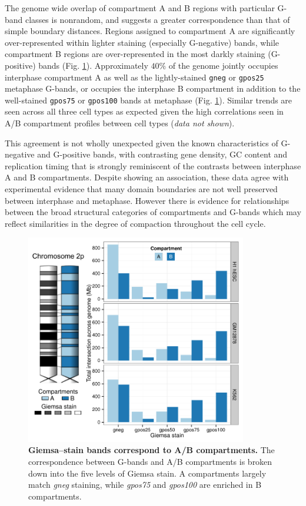\documentclass[a4paper,11pt,oneside]{book}
\begin{document}
The genome wide overlap of compartment A and B regions with particular G-band classes is nonrandom, and suggests a greater correspondence than that of simple boundary distances. Regions assigned to compartment A are significantly over-represented within lighter staining (especially G-negative) bands, while compartment B regions are over-represented in the most darkly staining (G-positive) bands (Fig. \ref{fig:gbands}). Approximately $40\%$ of the genome jointly occupies interphase compartment A as well as the lightly-stained \texttt{gneg} or \texttt{gpos25} metaphase G-bands, or occupies the interphase B compartment in addition to the well-stained \texttt{gpos75} or \texttt{gpos100} bands at metaphase (Fig. \ref{fig:gbands}). Similar trends are seen across all three cell types as expected given the high correlations seen in A/B compartment profiles between cell types (\emph{data not shown}). 

This agreement is not wholly unexpected given the known characteristics of G-negative and G-positive bands, with contrasting gene density, GC content and replication timing\cite{Furey2003} that is strongly reminiscent of the contrasts between interphase A and B compartments.\cite{Lieberman2009} Despite showing an association, these data agree with experimental evidence that many domain boundaries are not well preserved between interphase and metaphase. However there is evidence for relationships between the broad structural categories of compartments and G-bands which may reflect similarities in the degree of compaction throughout the cell cycle.

\begin{figure}
\begin{center} 
\includegraphics[width=3.8in]{gbands.pdf}
\captionsetup{width=\textwidth}
\caption[ Giemsa--stain bands correspond to A/B compartments.]{ {\bf Giemsa--stain bands correspond to A/B compartments.}
The correspondence between G-bands and A/B compartments is broken down into the five levels of Giemsa stain. A compartments largely match \emph{gneg} staining, while \emph{gpos75} and \emph{gpos100} are enriched in B compartments.
}\label{fig:gbands}
\end{center}
\end{figure} 
\end{document}
